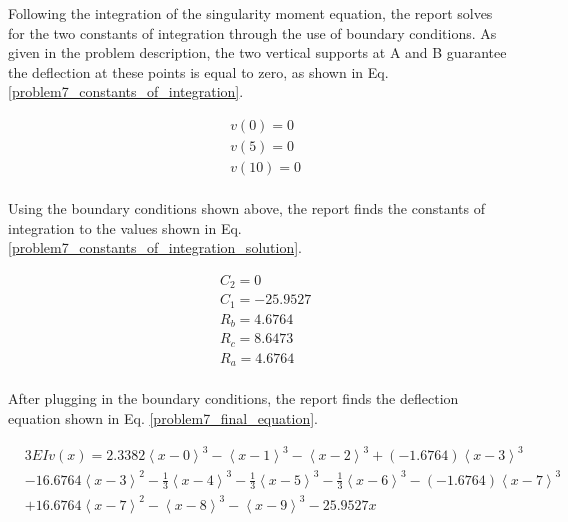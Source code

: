 \documentclass[a4paper]{article}
\begin{document}
Following the integration of the singularity moment equation, the report solves for the two constants of integration through the use of boundary conditions. As given in the problem description, the two vertical supports at A and B guarantee the deflection at these points is equal to zero, as shown in Eq. \ref{problem7_constants_of_integration}.

\begin{equation}
\begin{split}
	& v(0) = 0 \\
	& v(5) = 0 \\
	& v(10) = 0 \\
\end{split}
\label{problem7_constants_of_integration}
\end{equation}

Using the boundary conditions shown above, the report finds the constants of integration to the values shown in Eq. \ref{problem7_constants_of_integration_solution}.

\begin{equation}
\begin{split}
	& C_2 = 0 \\
	& C_1 =  -25.9527 \\
	& R_b = 4.6764 \\
	& R_c = 8.6473\\
	& R_a = 4.6764\\
\end{split}
\label{problem7_constants_of_integration_solution}
\end{equation}

After plugging in the boundary conditions, the report finds the deflection equation shown in Eq. \ref{problem7_final_equation}.

\begin{equation}
\begin{split}
& 3EI v(x) = 2.3382\left<x-0\right>^3 - \left<x-1\right>^3 - \left<x-2\right>^3 + (-1.6764)\left<x-3\right>^3  \\
& - 16.6764\left<x-3\right>^2 - \frac{1}{3}\left<x-4\right>^3 - \frac{1}{3}\left<x-5\right>^3 - \frac{1}{3}\left<x-6\right>^3 - (-1.6764)\left<x-7\right>^3  \\
& + 16.6764\left<x-7\right>^2 - \left<x-8\right>^3 - \left<x-9\right>^3 - 25.9527x\\
\end{split}
\label{problem7_final_equation}
\end{equation}
\end{document}
